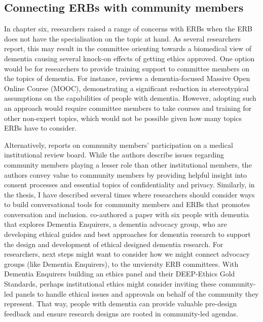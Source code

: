 \subsection{Connecting ERBs with community members}
\label{ERBs-Community-Members}
In chapter six, researchers raised a range of concerns with ERBs when the ERB does not have the specialisation on the topic at hand. As several researchers report, this may result in the committee orienting towards a biomedical view of dementia causing several knock-on effects of getting ethics approved. One option would be for researchers to provide training support to committee members on the topics of dementia. For instance, \cite{goldberg2015relationship} reviews a dementia-focused Massive Open Online Course (MOOC), demonstrating a significant reduction in stereotypical assumptions on the capabilities of people with dementia. However, adopting such an approach would require committee members to take courses and training for other non-expert topics, which would not be possible given how many topics ERBs have to consider. 

Alternatively, \cite{lidz2012participation} reports on community members' participation on a medical institutional review board. While the authors describe issues regarding community members playing a lesser role than other institutional members, the authors convey value to community members by providing helpful insight into consent processes and essential topics of confidentiality and privacy. Similarly, in the thesis, I have described several times where researchers should consider ways to build conversational tools for community members and ERBs that promotes conversation and inclusion. \cite{davies2021dementia} co-authored a paper with six people with dementia that explores Dementia Enquirers, a dementia advocacy group, who are developing ethical guides and best approaches for dementia research to support the design and development of ethical designed dementia research. For researchers, next steps might want to consider how we might connect advocacy groups (like Dementia Enquirers), to the unviersity ERB committees. With Dementia Enquirers building an ethics panel and their DEEP-Ethics Gold Standards, perhaps institutional ethics might consider inviting these community-led panels to handle ethical issues and approvals on behalf of the community they represent. That way, people with dementia can provide valuable pre-design feedback and ensure research designs are rooted in community-led agendas. 


